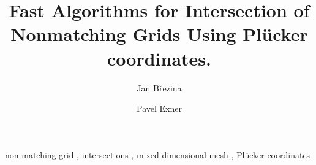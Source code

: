 \documentclass{elsarticle}
\newcommand{\plucker}{Pl\"{u}cker }
\begin{document}
\begin{frontmatter}



\title{Fast Algorithms for Intersection of Nonmatching Grids Using \plucker coordinates.}



\author[adr]{Jan B{\v r}ezina}

\author[adr]{Pavel Exner}

\address[adr]{Technical University of Liberec, Studentsk{\' a} 1402/2, 461 17 Liberec 1, Czech Republic}


\begin{abstract}
\end{abstract}

\begin{keyword}
non-matching grid \sep 
intersections \sep
mixed-dimensional mesh \sep
\plucker coordinates




\end{keyword}

\end{frontmatter}
\end{document}
